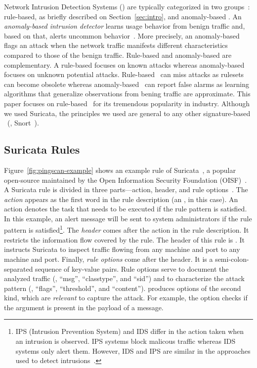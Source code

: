 \documentclass[sigconf,review, anonymous]{acmart}
\begin{document}
\sloppy Network Intrusion Detection Systems (\nids{}) are typically categorized in two
groups~\cite{kumar2007survey}: rule-based, as briefly described on
Section~\ref{sec:intro}, and anomaly-based \nids. An
\emph{anomaly-based intrusion detector} learns usage behavior from
benign traffic and, based on that, alerts uncommon
behavior~\cite{7579764,kumar2007survey,Mitchell:2014:SID:2597757.2542049,cordy-etal-issta19}. More
precisely, an anomaly-based \nids{} flags an attack when the network
traffic manifests different characteristics compared to those of the
benign traffic. Rule-based \nids{} and anomaly-based \nids{} are
complementary. A rule-based \nids{} focuses on known attacks whereas
anomaly-based \nids{} focuses on unknown potential attacks. Rule-based
\nids\ can miss attacks as rulesets can become obsolete whereas
anomaly-based \nids\ can report false alarms as learning algorithms
that generalize observations from bening traffic are approximate.
This paper focuses on rule-based \nids\ for its tremendous popularity
in industry. Although we used Suricata, the
principles we used are general to any other signature-based
\nids~(\eg{}, Snort~\cite{snort}).

\subsection{Suricata Rules}
\label{sec:example-suricata-rules}

Figure~\ref{fig:pingscan-example} shows an example rule of
Suricata~\cite{suricata}, a popular open-source \nids{} maintained by
the Open Information Security Foundation (OISF)~\cite{oisf}.  A
Suricata rule is divided in three parts---action, header, and rule
options~\cite{suri-rule-format}. The \emph{action} appears as the
first word in the rule description (an , in this
case). An action denotes the task that needs to be executed if the
rule pattern is satisfied.  In this example, an alert message will be
sent to system administrators if the rule pattern is
satisfied\footnote{IPS (Intrusion Prevention System) and IDS differ in
  the action taken when an intrusion is observed. IPS systems block
  malicous traffic whereas IDS systems only alert them. However, IDS
  and IPS are similar in the approaches used to detect
  intrusions~\cite{ids-ips}.}. The \emph{header} comes after the
action in the rule description. It restricts the information flow
covered by the rule. The header of this rule is . It instructs Suricata to inspect  traffic
flowing from any machine and port to any machine and port. Finally, \emph{rule options} come after the
header. It is a semi-colon-separated sequence of key-value pairs. Rule
options serve to document the analyzed traffic (\eg{}, ``msg'',
``classtype'', and ``sid'') and to characterize the attack pattern
(\eg, ``flags'', ``threshold'', and ``content''). \tname{} produces
options of the second kind, which are \emph{relevant} to capture the
attack. For example, the option  checks if the
argument is present in the payload of a message.
\end{document}
